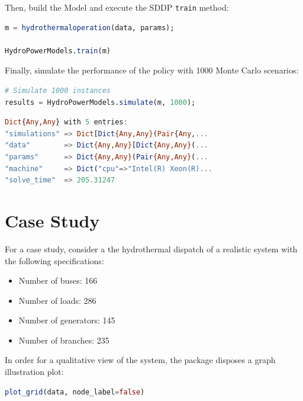 \documentclass{juliacon}
\begin{document}
Then, build the Model and execute the SDDP \texttt{train} method:

\begin{lstlisting}[language = Julia]
m = hydrothermaloperation(data, params);

HydroPowerModels.train(m)
\end{lstlisting}

Finally, simulate the performance of the policy with 1000 Monte Carlo scenarios:

\begin{lstlisting}[language = Julia]
# Simulate 1000 instances
results = HydroPowerModels.simulate(m, 1000);
\end{lstlisting}
\begin{lstlisting}[language = Julia]
 Dict{Any,Any} with 5 entries:
"simulations" => Dict[Dict{Any,Any}(Pair{Any,...
"data"        => Dict{Any,Any}[Dict{Any,Any}(...
"params"      => Dict{Any,Any}(Pair{Any,Any}(...
"machine"     => Dict("cpu"=>"Intel(R) Xeon(R)...
"solve_time"  => 205.31247
\end{lstlisting}

\section{Case Study}
\label{sec:case}

For a case study, consider a the hydrothermal dispatch of a realistic system with the following specifications:

\begin{itemize}
    \item Number of buses: 166
    \item Number of loads: 286
    \item Number of generators: 145
    \item Number of branches: 235
\end{itemize}

In order for a qualitative view of the system, the package disposes a graph illustration plot:

\begin{lstlisting}[language = Julia]
plot_grid(data, node_label=false)
\end{lstlisting}
\end{document}
